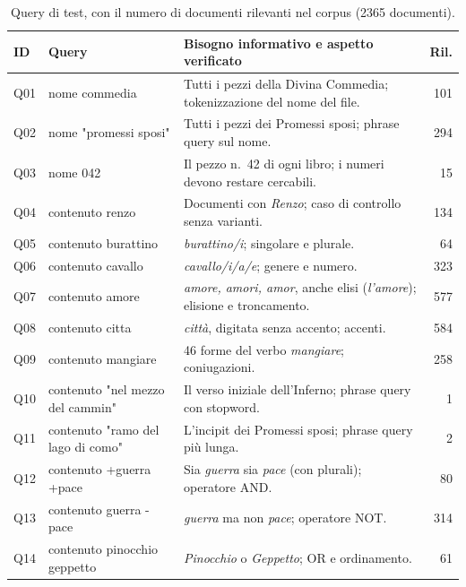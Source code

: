\documentclass[10pt,a4paper,twocolumn]{article}
\begin{document}
\begin{table}[t]
\centering\footnotesize
\caption{Query di test, con il numero di documenti rilevanti nel corpus (2365 documenti).}
\label{tab:query}
\begin{tabularx}{\textwidth}{@{}l>{\ttfamily}lXr@{}}
\toprule
\textbf{ID} & \textbf{\normalfont\bfseries Query} & \textbf{Bisogno informativo e aspetto verificato} & \textbf{Ril.} \\
\midrule
Q01 & nome commedia                      & Tutti i pezzi della Divina Commedia; tokenizzazione del nome del file. & 101 \\
Q02 & nome "promessi sposi"              & Tutti i pezzi dei Promessi sposi; phrase query sul nome. & 294 \\
Q03 & nome 042                           & Il pezzo n.\ 42 di ogni libro; i numeri devono restare cercabili. & 15 \\
Q04 & contenuto renzo                    & Documenti con \emph{Renzo}; caso di controllo senza varianti. & 134 \\
Q05 & contenuto burattino                & \emph{burattino/i}; singolare e plurale. & 64 \\
Q06 & contenuto cavallo                  & \emph{cavallo/i/a/e}; genere e numero. & 323 \\
Q07 & contenuto amore                    & \emph{amore, amori, amor}, anche elisi (\emph{l'amore}); elisione e troncamento. & 577 \\
Q08 & contenuto citta                    & \emph{città}, digitata senza accento; accenti. & 584 \\
Q09 & contenuto mangiare                 & 46 forme del verbo \emph{mangiare}; coniugazioni. & 258 \\
Q10 & contenuto "nel mezzo del cammin"   & Il verso iniziale dell'Inferno; phrase query con stopword. & 1 \\
Q11 & contenuto "ramo del lago di como"  & L'incipit dei Promessi sposi; phrase query più lunga. & 2 \\
Q12 & contenuto +guerra +pace            & Sia \emph{guerra} sia \emph{pace} (con plurali); operatore AND. & 80 \\
Q13 & contenuto guerra -pace             & \emph{guerra} ma non \emph{pace}; operatore NOT. & 314 \\
Q14 & contenuto pinocchio geppetto       & \emph{Pinocchio} o \emph{Geppetto}; OR e ordinamento. & 61 \\
\bottomrule
\end{tabularx}
\end{table}
\end{document}
